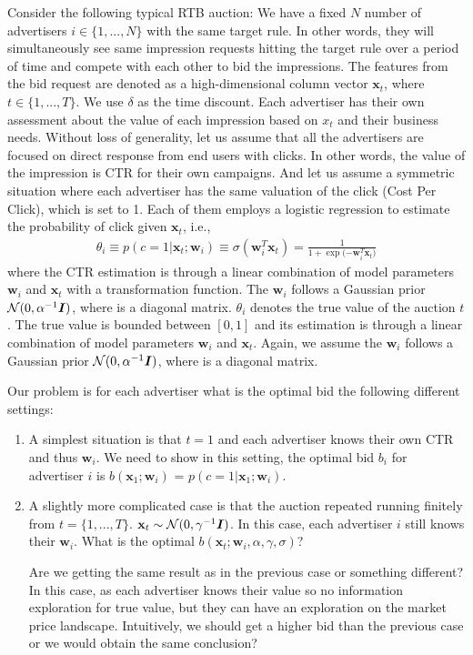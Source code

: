 Consider the following typical RTB auction: We have a fixed $N$ number of advertisers $i \in \{1,...,N\}$ with the same target rule. In other words, they will simultaneously see same impression requests hitting the target rule over a period of time and compete with each other to bid the impressions. The features from the bid request are denoted as a high-dimensional column vector $\mathbf{x}_t$, where $t \in \{1,...,T\}$. We use $\delta$ as the time discount. Each advertiser has their own assessment about the value of each impression based on $x_t$ and their business needs. Without loss of generality, let us assume that all the advertisers are focused on direct response from end users with clicks. In other words, the value of the impression is CTR for their own campaigns. And let us assume a symmetric situation where each advertiser has the same valuation of the click (Cost Per Click), which is set to 1. Each of them employs a logistic regression to estimate the probability of click given $\mathbf{x}_t$, i.e., 
\begin{align}
\label{eq:logistic_regressor}
\theta_i \equiv p(c=1|\mathbf{x}_t;\mathbf{w}_i) \equiv \sigma(\mathbf{w}_{i}^{T}\mathbf{x}_t) = \frac{1}{1+\exp{(-\mathbf{w}_{i}^{T}\mathbf{x}_t})}
\end{align}
where the CTR estimation is through a linear combination of model parameters $\mathbf{w}_i$ and $\mathbf{x}_t$ with a transformation function. The $\mathbf{w}_i$ follows a Gaussian prior $\mathcal{N}(0, \alpha ^{-1}\boldsymbol{I})$, where is a diagonal matrix. $\theta_i$ denotes the true value of the auction $t$. The true value is bounded between $[0,1]$ and its estimation is through a linear combination of model parameters $\mathbf{w}_i$ and $\mathbf{x}_t$. Again, we assume the $\mathbf{w}_i$ follows a Gaussian prior $\mathcal{N}(0, \alpha ^{-1}\boldsymbol{I})$, where is a diagonal matrix. 

Our problem is for each advertiser what is the optimal bid the following different settings: 

\begin{enumerate}

 \item A simplest situation is that $t=1$ and each advertiser knows their own CTR and thus $\mathbf{w}_i$. We need to show in this setting, the optimal bid $b_i$ for advertiser $i$ is $b(\mathbf{x}_1;\mathbf{w}_i)$ = $p(c=1|\mathbf{x}_1;\mathbf{w}_i)$.

 \item A slightly more complicated case is that the auction repeated running finitely from $t=\{1,...,T\}$. $\mathbf{x}_t\sim \mathcal{N}(0,\gamma \boldsymbol^{-1}\boldsymbol{I})$. In this case, each advertiser $i$ still knows their $\mathbf{w}_i$. What is the optimal $b(\mathbf{x}_t; \mathbf{w}_i,\alpha,\gamma ,\sigma)$?

Are we getting the same result as in the previous case or something different? In this case, as each advertiser knows their value so no information exploration for true value, but they can have an exploration on the market price landscape. Intuitively, we should get a higher bid than the previous case or we would obtain the same conclusion? 

\end{enumerate}



